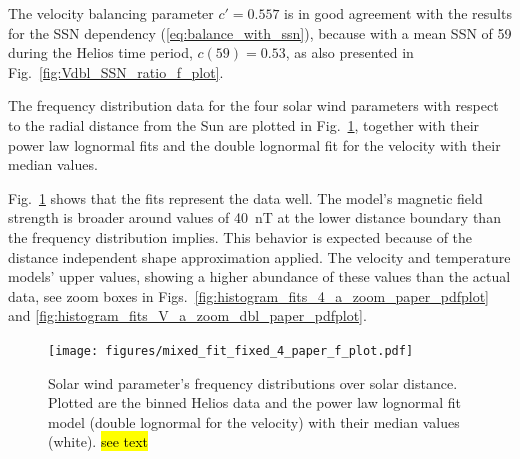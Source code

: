 The velocity balancing parameter $c' = 0.557$ is in good agreement with the results for the SSN dependency (\ref{eq:balance_with_ssn}), because with a mean SSN of 59 during the Helios time period, $c(59) = 0.53$, as also presented in Fig.~\ref{fig:Vdbl_SSN_ratio_f_plot}.

The frequency distribution data for the four solar wind parameters with respect to the radial distance from the Sun are plotted in Fig.~\ref{fig:mixed_fit_fixed_4_paper_f_plot}, together with their power law lognormal fits and the double lognormal fit for the velocity with their median values.

Fig.~\ref{fig:mixed_fit_fixed_4_paper_f_plot} shows that the fits represent the data well. The model’s magnetic field strength is broader around values of \SI{40}{nT} at the lower distance boundary than the frequency distribution implies. This behavior is expected because of the distance independent shape approximation applied. The velocity and temperature models’ upper values, showing a higher abundance of these values than the actual
data, see zoom boxes in Figs.~\ref{fig:histogram_fits_4_a_zoom_paper_pdfplot} and \ref{fig:histogram_fits_V_a_zoom_dbl_paper_pdfplot}.
\begin{figure}
	\texttt{[image: figures/mixed\_fit\_fixed\_4\_paper\_f\_plot.pdf]}
	\caption{Solar wind parameter's frequency distributions over solar distance. Plotted are the binned Helios data and the power law lognormal fit model (double lognormal for the velocity) with their median values (white). \hl{see text}}
	\label{fig:mixed_fit_fixed_4_paper_f_plot}
\end{figure}

